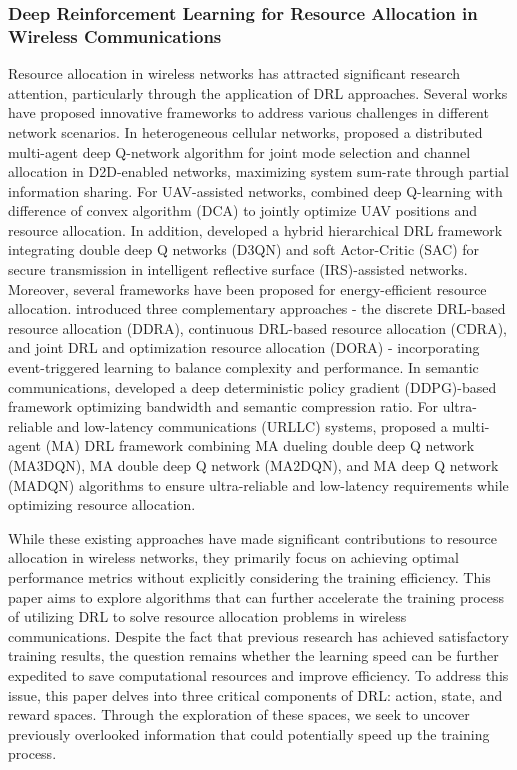 \subsubsection{Deep Reinforcement Learning for Resource Allocation in Wireless Communications}

Resource allocation in wireless networks has attracted significant research attention, particularly through the application of DRL approaches. Several works have proposed innovative frameworks to address various challenges in different network scenarios. In heterogeneous cellular networks, \cite{zhi2022deep} proposed a distributed multi-agent deep Q-network algorithm for joint mode selection and channel allocation in D2D-enabled networks, maximizing system sum-rate through partial information sharing. For UAV-assisted networks, \cite{luong2021deep} combined deep Q-learning with difference of convex algorithm (DCA) to jointly optimize UAV positions and resource allocation. In addition, \cite{wang2023hybrid} developed a hybrid hierarchical DRL framework integrating double deep Q networks (D3QN) and soft Actor-Critic (SAC) for secure transmission in intelligent reflective surface (IRS)-assisted networks. Moreover,
several frameworks have been proposed for energy-efficient resource allocation. \cite{wang2020drl} introduced three complementary approaches - the discrete DRL-based resource allocation (DDRA), continuous DRL-based resource allocation (CDRA), and joint DRL and optimization resource allocation (DORA) - incorporating event-triggered learning to balance complexity and performance. In semantic communications, \cite{zhang2023drl} developed a deep deterministic policy gradient (DDPG)-based framework optimizing bandwidth and semantic compression ratio. For ultra-reliable and low-latency communications (URLLC) systems, \cite{tran2023multi} proposed a multi-agent (MA) DRL framework combining MA dueling double deep Q network (MA3DQN), MA double deep Q network (MA2DQN), and  MA deep Q network (MADQN) algorithms to ensure ultra-reliable and low-latency requirements while optimizing resource allocation.

While these existing approaches have made significant contributions to resource allocation in wireless networks, they primarily focus on achieving optimal performance metrics without explicitly considering the training efficiency. This paper aims to explore algorithms that can further accelerate the training process of utilizing DRL to solve resource allocation problems in wireless communications. Despite the fact that previous research has achieved satisfactory training results, the question remains whether the learning speed can be further expedited to save computational resources and improve efficiency. To address this issue, this paper delves into three critical components of DRL: action, state, and reward spaces. Through the exploration of these spaces, we seek to uncover previously overlooked information that could potentially speed up the training process.


